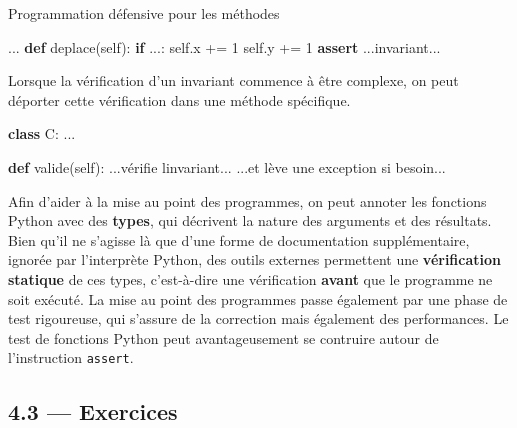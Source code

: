 \documentclass[a4paper,17pt]{extarticle}
\newenvironment{Shaded}{}{}
\newcommand{\KeywordTok}[1]{\textcolor[rgb]{0.00,0.44,0.13}{\textbf{{#1}}}}
\newcommand{\DecValTok}[1]{\textcolor[rgb]{0.25,0.63,0.44}{{#1}}}
\newcommand{\StringTok}[1]{\textcolor[rgb]{0.25,0.44,0.63}{{#1}}}
\newcommand{\NormalTok}[1]{{#1}}
\newcommand{\VariableTok}[1]{\textcolor[rgb]{0.10,0.09,0.49}{{#1}}}
\newcommand{\ControlFlowTok}[1]{\textcolor[rgb]{0.00,0.44,0.13}{\textbf{{#1}}}}
\newcommand{\OperatorTok}[1]{\textcolor[rgb]{0.40,0.40,0.40}{{#1}}}
\begin{document}
\begin{exemple}
Programmation défensive pour les méthodes

\begin{Shaded}
\begin{Highlighting}[]
\NormalTok{    ...}
    \KeywordTok{def}\NormalTok{ deplace(}\VariableTok{self}\NormalTok{):}
        \ControlFlowTok{if}\NormalTok{ ...:}
            \VariableTok{self}\NormalTok{.x }\OperatorTok{+=} \DecValTok{1}
            \VariableTok{self}\NormalTok{.y }\OperatorTok{+=} \DecValTok{1}
        \ControlFlowTok{assert}\NormalTok{ ...invariant...}
\end{Highlighting}
\end{Shaded}

        \end{exemple}\begin{exemple}
    Lorsque la vérification d'un invariant commence à être complexe, on peut
déporter cette vérification dans une méthode spécifique.

\begin{Shaded}
\begin{Highlighting}[]
\KeywordTok{class}\NormalTok{ C:}
\NormalTok{    ...}

    \KeywordTok{def}\NormalTok{ valide(}\VariableTok{self}\NormalTok{):}
\NormalTok{        ...vérifie l}\StringTok{\textquotesingle{}invariant...}
\StringTok{        ...et lève une exception si besoin...}
\end{Highlighting}
\end{Shaded}

        \end{exemple}\begin{retenir}
    Afin d'aider à la mise au point des programmes, on peut annoter les
fonctions Python avec des \textbf{types}, qui décrivent la nature des
arguments et des résultats. Bien qu'il ne s'agisse là que d'une forme de
documentation supplémentaire, ignorée par l'interprète Python, des
outils externes permettent une \textbf{vérification statique} de ces
types, c'est-à-dire une vérification \textbf{avant} que le programme ne
soit exécuté. La mise au point des programmes passe également par une
phase de test rigoureuse, qui s'assure de la correction mais également
des performances. Le test de fonctions Python peut avantageusement se
contruire autour de l'instruction \texttt{assert}.

        \end{retenir}
    \hypertarget{exercices}{%
\subsection{4.3 --- Exercices}\label{exercices}}
\end{document}
